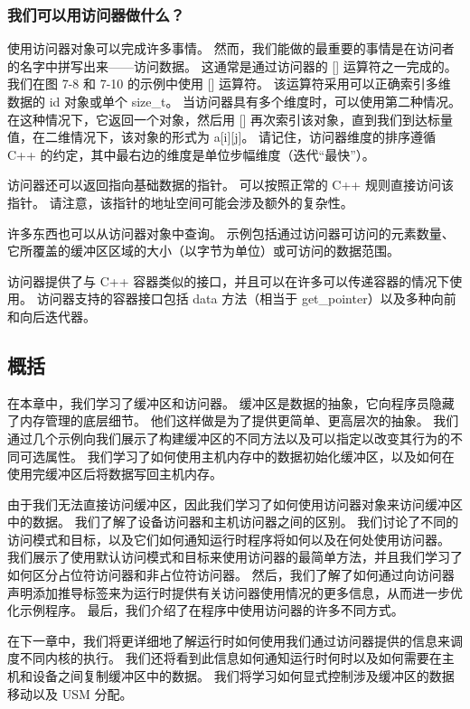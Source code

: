 \subsubsection{我们可以用访问器做什么？}
使用访问器对象可以完成许多事情。 然而，我们能做的最重要的事情是在访问者的名字中拼写出来——访问数据。 这通常是通过访问器的 [] 运算符之一完成的。 我们在图 7-8 和 7-10 的示例中使用 [] 运算符。 该运算符采用可以正确索引多维数据的 id 对象或单个 size\_t。 当访问器具有多个维度时，可以使用第二种情况。 在这种情况下，它返回一个对象，然后用 [] 再次索引该对象，直到我们到达标量值，在二维情况下，该对象的形式为 a[i][j]。 请记住，访问器维度的排序遵循 C++ 的约定，其中最右边的维度是单位步幅维度（迭代“最快”）。

访问器还可以返回指向基础数据的指针。 可以按照正常的 C++ 规则直接访问该指针。 请注意，该指针的地址空间可能会涉及额外的复杂性。

许多东西也可以从访问器对象中查询。 示例包括通过访问器可访问的元素数量、它所覆盖的缓冲区区域的大小（以字节为单位）或可访问的数据范围。

访问器提供了与 C++ 容器类似的接口，并且可以在许多可以传递容器的情况下使用。 访问器支持的容器接口包括 data 方法（相当于 get\_pointer）以及多种向前和向后迭代器。

\subsection{概括}
在本章中，我们学习了缓冲区和访问器。 缓冲区是数据的抽象，它向程序员隐藏了内存管理的底层细节。 他们这样做是为了提供更简单、更高层次的抽象。 我们通过几个示例向我们展示了构建缓冲区的不同方法以及可以指定以改变其行为的不同可选属性。 我们学习了如何使用主机内存中的数据初始化缓冲区，以及如何在使用完缓冲区后将数据写回主机内存。

由于我们无法直接访问缓冲区，因此我们学习了如何使用访问器对象来访问缓冲区中的数据。 我们了解了设备访问器和主机访问器之间的区别。 我们讨论了不同的访问模式和目标，以及它们如何通知运行时程序将如何以及在何处使用访问器。 我们展示了使用默认访问模式和目标来使用访问器的最简单方法，并且我们学习了如何区分占位符访问器和非占位符访问器。 然后，我们了解了如何通过向访问器声明添加推导标签来为运行时提供有关访问器使用情况的更多信息，从而进一步优化示例程序。 最后，我们介绍了在程序中使用访问器的许多不同方式。

在下一章中，我们将更详细地了解运行时如何使用我们通过访问器提供的信息来调度不同内核的执行。 我们还将看到此信息如何通知运行时何时以及如何需要在主机和设备之间复制缓冲区中的数据。 我们将学习如何显式控制涉及缓冲区的数据移动以及 USM 分配。